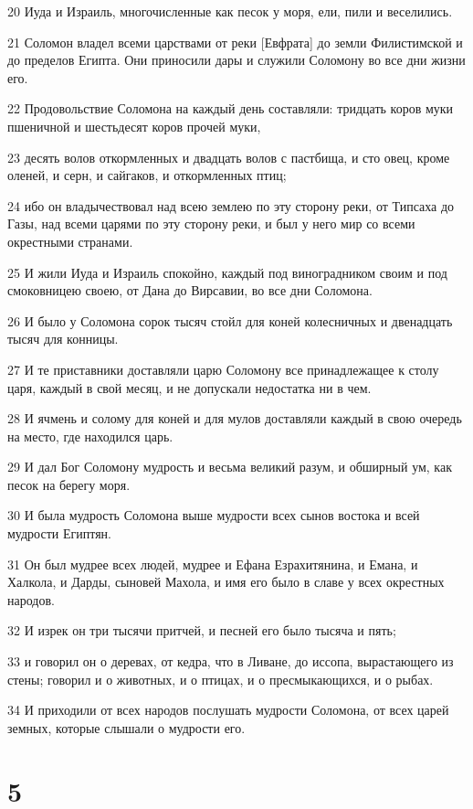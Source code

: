 \par 20 Иуда и Израиль, многочисленные как песок у моря, ели, пили и веселились.
\par 21 Соломон владел всеми царствами от реки [Евфрата] до земли Филистимской и до пределов Египта. Они приносили дары и служили Соломону во все дни жизни его.
\par 22 Продовольствие Соломона на каждый день составляли: тридцать коров муки пшеничной и шестьдесят коров прочей муки,
\par 23 десять волов откормленных и двадцать волов с пастбища, и сто овец, кроме оленей, и серн, и сайгаков, и откормленных птиц;
\par 24 ибо он владычествовал над всею землею по эту сторону реки, от Типсаха до Газы, над всеми царями по эту сторону реки, и был у него мир со всеми окрестными странами.
\par 25 И жили Иуда и Израиль спокойно, каждый под виноградником своим и под смоковницею своею, от Дана до Вирсавии, во все дни Соломона.
\par 26 И было у Соломона сорок тысяч стойл для коней колесничных и двенадцать тысяч для конницы.
\par 27 И те приставники доставляли царю Соломону все принадлежащее к столу царя, каждый в свой месяц, и не допускали недостатка ни в чем.
\par 28 И ячмень и солому для коней и для мулов доставляли каждый в свою очередь на место, где находился царь.
\par 29 И дал Бог Соломону мудрость и весьма великий разум, и обширный ум, как песок на берегу моря.
\par 30 И была мудрость Соломона выше мудрости всех сынов востока и всей мудрости Египтян.
\par 31 Он был мудрее всех людей, мудрее и Ефана Езрахитянина, и Емана, и Халкола, и Дарды, сыновей Махола, и имя его было в славе у всех окрестных народов.
\par 32 И изрек он три тысячи притчей, и песней его было тысяча и пять;
\par 33 и говорил он о деревах, от кедра, что в Ливане, до иссопа, вырастающего из стены; говорил и о животных, и о птицах, и о пресмыкающихся, и о рыбах.
\par 34 И приходили от всех народов послушать мудрости Соломона, от всех царей земных, которые слышали о мудрости его.

\chapter{5}

